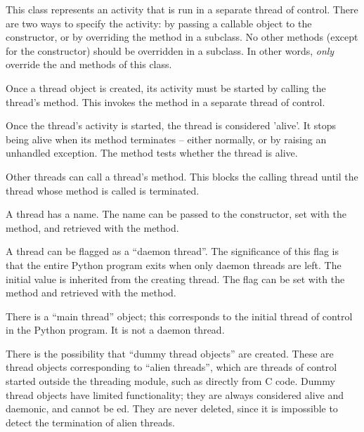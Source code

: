This class represents an activity that is run in a separate thread
of control.  There are two ways to specify the activity: by
passing a callable object to the constructor, or by overriding the
 method in a subclass.  No other methods (except for the
constructor) should be overridden in a subclass.  In other words, 
\emph{only}  override the  and 
methods of this class.

Once a thread object is created, its activity must be started by
calling the thread's  method.  This invokes the
 method in a separate thread of control.

Once the thread's activity is started, the thread is considered
'alive'. It stops being alive when its  method terminates
-- either normally, or by raising an unhandled exception.  The
 method tests whether the thread is alive.

Other threads can call a thread's  method.  This blocks
the calling thread until the thread whose  method is
called is terminated.

A thread has a name.  The name can be passed to the constructor,
set with the  method, and retrieved with the
 method.

A thread can be flagged as a ``daemon thread''.  The significance
of this flag is that the entire Python program exits when only
daemon threads are left.  The initial value is inherited from the
creating thread.  The flag can be set with the 
method and retrieved with the  method.

There is a ``main thread'' object; this corresponds to the
initial thread of control in the Python program.  It is not a
daemon thread.

There is the possibility that ``dummy thread objects'' are created.
These are thread objects corresponding to ``alien threads'', which
are threads of control started outside the threading module, such as
directly from C code.  Dummy thread objects have limited
functionality; they are always considered alive and daemonic, and
cannot be ed.  They are never deleted, since it is
impossible to detect the termination of alien threads.


